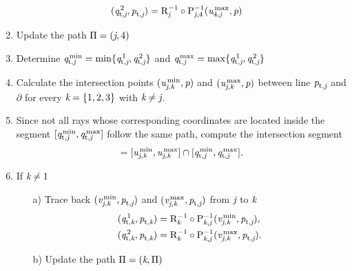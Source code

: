 \begin{enumerate}
\begin{equation*}
\begin{aligned}
(\textit{q}_{\textrm{t,} \textit{\textit{j}}}^{\,2}, \textit{p}_{\textrm{t,} \textit{\textit{j}}}) & =\mathrm{R}_{{\textit{j}}}^{-1}\circ \mathrm{P}_{{\textit{j},4}}^{-1}(\textit{u}_{4,\textit{j}}^\textrm{\,max}, \textit{p})
\end{aligned}
\end{equation*}
\item Update the path $\Pi = (\textit{j}, 4)$
\item Determine $\textit{q}_{\textrm{t,} \textit{\textit{j}}}^\textrm{\,min}= \min\{\textit{q}_{\textrm{t,} \textit{\textit{j}}}^{\,1}, \textit{q}_{\textrm{t,} \textit{\textit{j}}}^{\,2}\}$ and $\textit{q}_{\textrm{t,} \textit{\textit{j}}}^\textrm{\,max}= \max\{\textit{q}_{\textrm{t,} \textit{\textit{j}}}^{\,1}, \textit{q}_{\textrm{t,} \textit{\textit{j}}}^{\,2}\}$
\item Calculate the intersection points $(\textit{u}_{\textit{j},\textit{k}}^\textrm{\,min}, \textit{p})$ and $(\textit{u}_{\textit{j},\textit{k}}^\textrm{\,max}, \textit{p})$ between line $\textit{p}_{\textrm{t,} \textit{\textit{j}}}$ and 
$\partial$ for every $\textit{k}=\{1,2,3\}$ with $\textit{k}\neq\textit{j}$.
\item Since not all rays whose corresponding coordinates are located inside the segment
$[\textit{q}_{\textrm{t,} \textit{\textit{j}}}^\textrm{\,min}, \textit{q}_{\textrm{t,} \textit{\textit{j}}}^\textrm{\,max}]$ follow the same path,
 compute the intersection segment 
\begin{equation*}
[\variabile{v}_{\lineai, \lineaj}^\textrm{\,min}, \variabile{v}_{\lineai, \lineaj}^\textrm{\,max}] = [\variabile{u}_{\lineai, \lineaj}^\textrm{\,min}, \variabile{u}_{\lineai, \lineaj}^\textrm{\,max}]\cap
 [\pos{t,}{\lineai}^\textrm{\,min}, \pos{t,}{\lineai}^\textrm{\,max}].
\end{equation*}
\item If $\textit{k}\neq 1$ 
\begin{itemize}
\item[a)] Trace back $(\textit{v}_{\textit{j}, \textit{k}}^\textrm{\,min}, \textit{p}_{\textrm{t,} \textit{\textit{j}}})$ and $(\textit{v}_{\textit{j}, \textit{k}}^\textrm{\,max}, \textit{p}_{\textrm{t,} \textit{\textit{j}}})$ from $\textit{j}$ to $\textit{k}$ 
\begin{equation*}
\begin{aligned}
(\textit{q}_{\textrm{t,} \textit{\textit{k}}}^{\,1}, \textit{p}_{\textrm{t,} \textit{\textit{k}}})& =\mathrm{R}_{{\textit{k}}}^{-1}\circ \mathrm{P}_{{\textit{k},\textit{j}}}^{-1}(\textit{v}_{\textit{j}, \textit{k}}^\textrm{\,min}, \textit{p}_{\textrm{t,} \textit{\textit{j}}}),  \\
(\textit{q}_{\textrm{t,} \textit{\textit{k}}}^{\,2}, \textit{p}_{\textrm{t,} \textit{\textit{k}}}) & =\mathrm{R}_{{\textit{k}}}^{-1}\circ \mathrm{P}_{{\textit{k},\textit{j}}}^{-1}(\textit{v}_{\textit{j}, \textit{k}}^\textrm{\,max}, \textit{p}_{\textrm{t,} \textit{\textit{j}}}).
\end{aligned}
\end{equation*}
\item[b)] Update the path $\Pi = (\textit{k}, \Pi)$

\end{itemize}
\end{enumerate}
